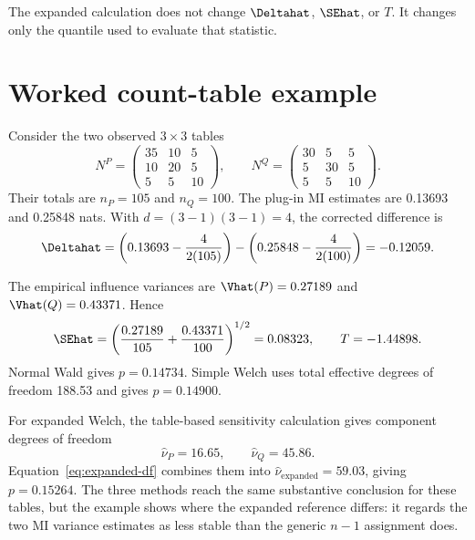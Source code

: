 The expanded calculation does not change \(\Deltahat\), \(\SEhat\), or
\(T\). It changes only the quantile used to evaluate that statistic.

\section{Worked count-table example}

Consider the two observed \(3\times3\) tables
\begin{equation}
  N^P=
  \begin{pmatrix}
  35&10&5\\
  10&20&5\\
  5&5&10
  \end{pmatrix},
  \qquad
  N^Q=
  \begin{pmatrix}
  30&5&5\\
  5&30&5\\
  5&5&10
  \end{pmatrix}.
  \label{eq:worked-tables}
\end{equation}
Their totals are \(n_P=105\) and \(n_Q=100\). The plug-in MI estimates are
0.13693 and 0.25848 nats. With \(d=(3-1)(3-1)=4\), the corrected difference is
\begin{equation}
  \Deltahat
  =\left(0.13693-\frac{4}{2(105)}\right)
  -\left(0.25848-\frac{4}{2(100)}\right)
  =-0.12059.
\end{equation}

The empirical influence variances are
\(\Vhat(P)=0.27189\) and \(\Vhat(Q)=0.43371\). Hence
\begin{equation}
  \SEhat
  =\left(\frac{0.27189}{105}+\frac{0.43371}{100}\right)^{1/2}
  =0.08323,
  \qquad
  T=-1.44898.
\end{equation}
Normal Wald gives \(p=0.14734\). Simple Welch uses total effective degrees of
freedom 188.53 and gives \(p=0.14900\).

For expanded Welch, the table-based sensitivity calculation gives component
degrees of freedom
\begin{equation}
  \widehat\nu_P=16.65,
  \qquad
  \widehat\nu_Q=45.86.
\end{equation}
Equation~\eqref{eq:expanded-df} combines them into
\(\widehat\nu_{\mathrm{expanded}}=59.03\), giving \(p=0.15264\). The three
methods reach the same substantive conclusion for these tables, but the
example shows where the expanded reference differs: it regards the two MI
variance estimates as less stable than the generic \(n-1\) assignment does.


